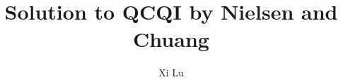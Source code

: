 \documentclass{report}
\title{Solution to QCQI by Nielsen and Chuang}
\author{Xi Lu}
\begin{document}
    \fontsize{14pt}{\baselineskip}\selectfont
    \maketitle
    \tableofcontents

    

    
    
    
    
    
    

    
    
    

    
    
    
    
    
    

    
    
    
    
    

    
    
    
    
    
    

    
    

    
    
    
    

    
    
    
    

    
    
    
    
    
    
    

    
    
    
    

    

    \appendix
    \renewcommand{\thechapter}{A\arabic{chapter}}

    
    
    
    
    
    
\end{document}
